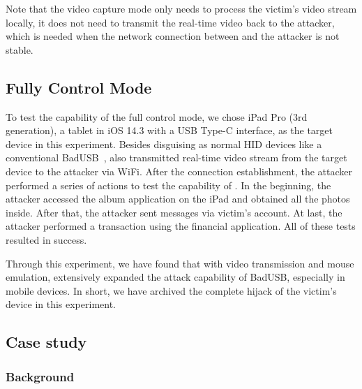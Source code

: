 Note that the video capture mode only needs to
process the victim's video stream locally, it does not need to transmit the real-time video back to the attacker, which is needed when the network connection between \tool and the attacker is not stable.

\subsection{Fully Control Mode}

To test the capability of the full control mode, we chose iPad Pro (3rd
	generation), a tablet in iOS 14.3 with a USB Type-C interface, as the target
device in this experiment.  Besides disguising as normal HID devices like a
conventional BadUSB~\cite{badusb}, \tool also transmitted real-time video
stream from the target device to the attacker via WiFi.  After the connection
establishment, the attacker performed a series of actions to test the capability of
\tool. In the beginning, the attacker accessed the album application on the iPad and
obtained all the photos inside. After that, the attacker sent messages via victim's
account. At last, the attacker performed a transaction using the
financial application. All of these tests resulted in success.

Through this experiment, we have found that with video transmission and mouse
emulation, \tool extensively expanded the attack capability of BadUSB,
especially in mobile devices. In short, we have archived the complete hijack of the victim's
device in this experiment.

\subsection{Case study}
\label{subsec:case_study}

\subsubsection{Background}


